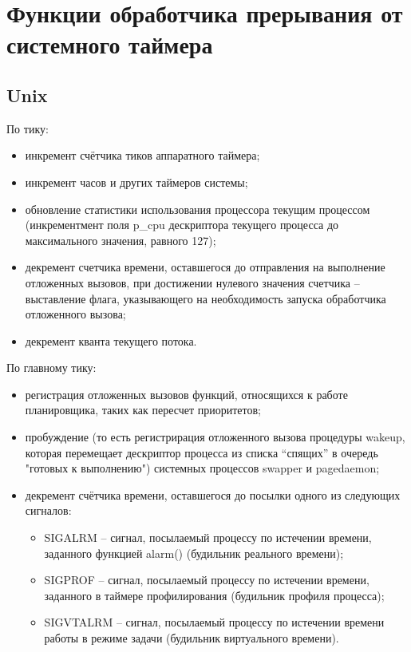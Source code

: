 \chapter{Функции обработчика прерывания от системного таймера}

\section{Unix}

По тику:

\begin{itemize}
	\item инкремент счётчика тиков аппаратного таймера;
	\item инкремент часов и других таймеров системы;
	\item обновление статистики использования процессора текущим процессом (инкрементмент поля p\_cpu дескриптора текущего процесса до максимального значения, равного 127);
	\item декремент счетчика времени, оставшегося до отправления на выполнение отложенных вызовов, при достижении нулевого значения счетчика -- выставление флага, указывающего на необходимость запуска обработчика отложенного вызова;
	\item декремент кванта текущего потока.
\end{itemize}

По главному тику: 
\begin{itemize}
	\item регистрация отложенных вызовов функций, относящихся к работе планировщика,
	таких как пересчет приоритетов;
	\item пробуждение (то есть регистрирация отложенного вызова процедуры wakeup, которая перемещает дескриптор процесса из списка “спящих” в очередь "готовых к выполнению") системных процессов {\ttfamily swapper} и {\ttfamily pagedaemon};
	\item декремент счётчика времени, оставшегося до посылки одного из следующих сигналов:
	\begin{itemize}
		\item {\ttfamily SIGALRM} – сигнал, посылаемый процессу по истечении времени, заданного функцией {\ttfamily alarm()} (будильник реального времени);
		\item {\ttfamily SIGPROF} –  сигнал, посылаемый процессу по истечении времени, заданного в таймере профилирования (будильник профиля процесса);
		\item {\ttfamily SIGVTALRM} –  сигнал, посылаемый процессу по истечении времени работы в режиме задачи (будильник виртуального времени).
	\end{itemize}
\end{itemize}

